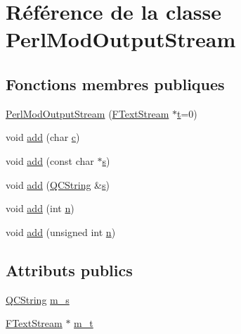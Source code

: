 \hypertarget{class_perl_mod_output_stream}{}\section{Référence de la classe Perl\+Mod\+Output\+Stream}
\label{class_perl_mod_output_stream}
\subsection*{Fonctions membres publiques}
\begin{DoxyCompactItemize}
\item 
\hyperlink{class_perl_mod_output_stream_a74b0ce7dc1e91181e3b145c6bd51239b}{Perl\+Mod\+Output\+Stream} (\hyperlink{class_f_text_stream}{F\+Text\+Stream} $\ast$\hyperlink{058__bracket__recursion_8tcl_a69e959f6901827e4d8271aeaa5fba0fc}{t}=0)
\item 
void \hyperlink{class_perl_mod_output_stream_a6970acf3298a0e408427b54d1b876cd5}{add} (char \hyperlink{060__command__switch_8tcl_ab14f56bc3bd7680490ece4ad7815465f}{c})
\item 
void \hyperlink{class_perl_mod_output_stream_a3551835e035096e026776c6182fbd2e0}{add} (const char $\ast$\hyperlink{060__command__switch_8tcl_a011c73f2dbb87635a3b4206c72355f6e}{s})
\item 
void \hyperlink{class_perl_mod_output_stream_a1bc1bba39566a20570d070a8047b4dd9}{add} (\hyperlink{class_q_c_string}{Q\+C\+String} \&\hyperlink{060__command__switch_8tcl_a011c73f2dbb87635a3b4206c72355f6e}{s})
\item 
void \hyperlink{class_perl_mod_output_stream_ab7ddab3bb38de8bf835a62895a792ff8}{add} (int \hyperlink{060__command__switch_8tcl_acdde3cd86eb2421ce8dbb2e85227d368}{n})
\item 
void \hyperlink{class_perl_mod_output_stream_aad5e9dc80caeb48eb84de1a1ef190136}{add} (unsigned int \hyperlink{060__command__switch_8tcl_acdde3cd86eb2421ce8dbb2e85227d368}{n})
\end{DoxyCompactItemize}
\subsection*{Attributs publics}
\begin{DoxyCompactItemize}
\item 
\hyperlink{class_q_c_string}{Q\+C\+String} \hyperlink{class_perl_mod_output_stream_abd23a5e420b365f3239937fd5091a19c}{m\+\_\+s}
\item 
\hyperlink{class_f_text_stream}{F\+Text\+Stream} $\ast$ \hyperlink{class_perl_mod_output_stream_a0000b5406fb4590ed62996f43ad3a192}{m\+\_\+t}
\end{DoxyCompactItemize}


